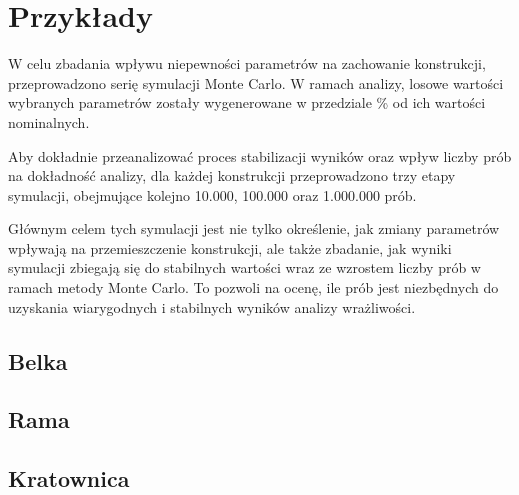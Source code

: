 \section{Przykłady}

W celu zbadania wpływu niepewności parametrów na zachowanie konstrukcji, przeprowadzono serię symulacji Monte Carlo.
W ramach analizy, losowe wartości wybranych parametrów zostały wygenerowane w przedziale \% od ich wartości nominalnych.

Aby dokładnie przeanalizować proces stabilizacji wyników oraz wpływ liczby prób na dokładność analizy,
dla każdej konstrukcji przeprowadzono trzy etapy symulacji, obejmujące kolejno 10.000, 100.000 oraz 1.000.000 prób.

Głównym celem tych symulacji jest nie tylko określenie, jak zmiany parametrów wpływają na przemieszczenie konstrukcji,
ale także zbadanie, jak wyniki symulacji zbiegają się do stabilnych wartości wraz ze wzrostem liczby prób w ramach metody Monte Carlo.
To pozwoli na ocenę, ile prób jest niezbędnych do uzyskania wiarygodnych i stabilnych wyników analizy wrażliwości.

\newpage
\subsection{Belka}


\newpage
\subsection{Rama}


\newpage
\subsection{Kratownica}

